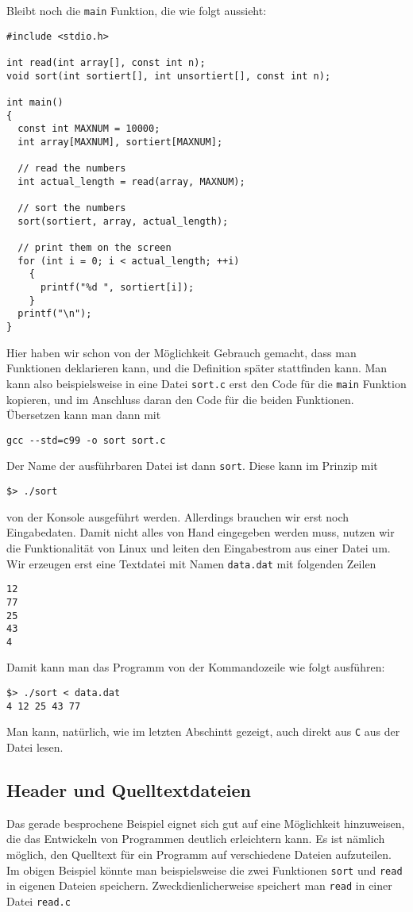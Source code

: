 Bleibt noch die \verb|main| Funktion, die wie folgt aussieht:
\begin{lstlisting}
#include <stdio.h>

int read(int array[], const int n);
void sort(int sortiert[], int unsortiert[], const int n);

int main()
{
  const int MAXNUM = 10000;
  int array[MAXNUM], sortiert[MAXNUM];

  // read the numbers
  int actual_length = read(array, MAXNUM);

  // sort the numbers
  sort(sortiert, array, actual_length);

  // print them on the screen
  for (int i = 0; i < actual_length; ++i)
    {
      printf("%d ", sortiert[i]);
    }
  printf("\n");
}
\end{lstlisting}
Hier haben wir schon von der Möglichkeit Gebrauch gemacht, dass man Funktionen deklarieren kann, und die Definition später stattfinden kann.
Man kann also beispielsweise in eine Datei \verb|sort.c| erst den Code für die \verb|main| Funktion kopieren, und im Anschluss daran den Code für die beiden Funktionen.
Übersetzen kann man dann mit
\begin{verbatim}
gcc --std=c99 -o sort sort.c
\end{verbatim}
Der Name der ausführbaren Datei ist dann \verb|sort|.
Diese kann im Prinzip mit
\begin{verbatim}
$> ./sort
\end{verbatim}
von der Konsole ausgeführt werden.
Allerdings brauchen wir erst noch Eingabedaten.
Damit nicht alles von Hand eingegeben werden muss, nutzen wir die Funktionalität von Linux und leiten den Eingabestrom aus einer Datei um.
Wir erzeugen erst eine Textdatei mit Namen \verb|data.dat| mit folgenden Zeilen
\begin{verbatim}
12
77
25
43
4
\end{verbatim}
Damit kann man das Programm von der Kommandozeile wie folgt ausführen:
\begin{verbatim}
$> ./sort < data.dat
4 12 25 43 77
\end{verbatim}
Man kann, natürlich, wie im letzten Abschintt gezeigt, auch direkt aus \texttt{C} aus der Datei lesen.

\subsection{Header und Quelltextdateien}

Das gerade besprochene Beispiel eignet sich gut auf eine Möglichkeit hinzuweisen, die das Entwickeln von Programmen deutlich erleichtern kann.
Es ist nämlich möglich, den Quelltext für ein Programm auf verschiedene Dateien aufzuteilen.
Im obigen Beispiel könnte man beispielsweise die zwei Funktionen \texttt{sort} und \texttt{read} in eigenen Dateien speichern. 
Zweckdienlicherweise speichert man \texttt{read} in einer Datei \texttt{read.c}

